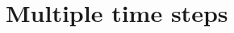 \documentclass[a4paper,10pt]{report}
\begin{document}
% 
% 
% 
% 
% 
% 
% 
% 
% 
% 
% 
% 

\section{Multiple time steps}
\end{document}
